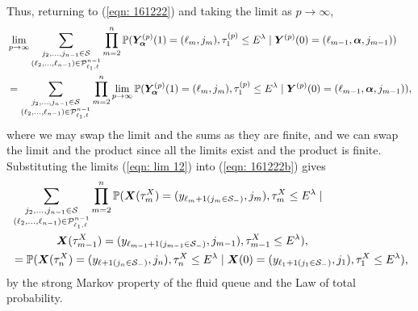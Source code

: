 Thus, returning to (\ref{eqn: 161222}) and taking the limit as \(p\to\infty\),  
\begin{align}
	&\lim_{p\to\infty}\sum_{\substack{j_2,\dots,j_{n-1}\in\mathcal S \\ (\ell_2,\dots,\ell_{n-1}) \in\mathcal P^{n-1}_{\ell_1,\ell}}}\prod_{m=2}^{n}\mathbb P(\bm{Y}_{\bm{\alpha}}^{(p)}(1) = (\ell_m, j_m), \tau_{1}^{(p)}\leq E^\lambda \nonumber
            	 \mid \boldsymbol Y^{(p)}(0) = (\ell_{m-1},\boldsymbol\alpha, j_{m-1})) \nonumber 
	\\ &=\sum_{\substack{j_2,\dots,j_{n-1}\in\mathcal S \\ (\ell_2,\dots,\ell_{n-1}) \in\mathcal P^{n-1}_{\ell_1,\ell}}}\prod_{m=2}^{n}\lim_{p\to\infty} \mathbb P(\bm{Y}_{\bm{\alpha}}^{(p)}(1) = (\ell_m, j_m), \tau_{1}^{(p)}\leq E^\lambda 
            	 \mid \boldsymbol Y^{(p)}(0) = (\ell_{m-1}, \boldsymbol\alpha,
	 	 j_{m-1}) ),
	 \label{eqn: 161222b}
\end{align}
where we may swap the limit and the sums as they are finite, and we can swap the limit and the product since all the limits exist and the product is finite. Substituting the limits (\ref{eqn: lim 12}) into (\ref{eqn: 161222b}) gives 
\begin{align}
	&\sum_{\substack{j_2,\dots,j_{n-1}\in\mathcal S \\ (\ell_2,\dots,\ell_{n-1}) \in\mathcal P^{n-1}_{\ell_1,\ell}}} \prod_{m=2}^{n}\mathbb P(\boldsymbol X(\tau_m^X) = (y_{\ell_{m}+1(j_{m}\in\mathcal S_-)}, j_m), \tau_{m}^X\leq E^\lambda\mid \nonumber
            	\\&\qquad\qquad  \boldsymbol X(\tau_{m-1}^X)=(y_{\ell_{m-1}+1(j_{m-1}\in\mathcal S_-)},j_{m-1}),\tau_{m-1}^X\leq E^\lambda),\nonumber
		\\&= \mathbb P(\boldsymbol X(\tau_n^X) = (y_{\ell+1(j_{n}\in\mathcal S_-)}, 
		j_n), \tau_{n}^X\leq E^\lambda \mid \boldsymbol X(0)=(y_{\ell_{1}+1(j_{1}\in\mathcal S_-)},
		j_{1}), 
		\tau_1^X\leq E^\lambda),
\end{align}
by the strong Markov property of the fluid queue and the Law of total probability.

